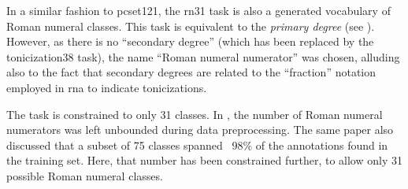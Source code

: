 
In a similar fashion to \gls{pcset121}, the \gls{rn31} task
is also a generated vocabulary of Roman numeral classes.
This task is equivalent to the \emph{primary degree} (see
). However, as there is no
``secondary degree'' (which has been replaced by the
\gls{tonicization38} task), the name ``Roman numeral
numerator'' was chosen, alluding also to the fact that
secondary degrees are related to the ``fraction'' notation
employed in \gls{rna} to indicate tonicizations.

The task is constrained to only 31 classes. In
\parencite{napoleslopez2021augmentednet}, the number of
Roman numeral numerators was left unbounded during data
preprocessing. The same paper also discussed that a subset
of 75 classes spanned ~98\% of the annotations found in the
training set. Here, that number has been constrained
further, to allow only 31 possible Roman numeral classes.
